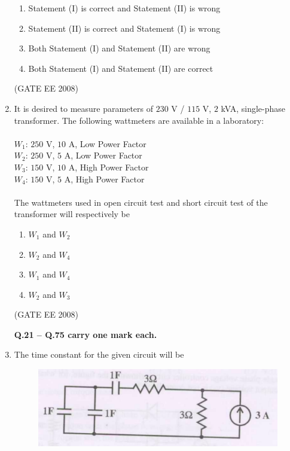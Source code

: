 \documentclass[journal,12pt,onecolumn]{IEEEtran}
\theoremstyle{remark}
\begin{document}
\begin{enumerate}[start=1, label=Q.\arabic*]
\begin{enumerate}[label=(\Alph*)]
    \item Statement (I) is correct and Statement (II) is wrong
    \item Statement (II) is correct and Statement (I) is wrong
    \item Both Statement (I) and Statement (II) are wrong
    \item Both Statement (I) and Statement (II) are correct
\end{enumerate}
\hfill (GATE EE 2008)



\item It is desired to measure parameters of $230$ V / $115$ V, $2$ kVA, single-phase transformer. The following wattmeters are available in a laboratory: \\
\\
$W_1$: $250$ V, $10$ A, Low Power Factor \\
$W_2$: $250$ V, $5$ A, Low Power Factor \\
$W_3$: $150$ V, $10$ A, High Power Factor \\
$W_4$: $150$ V, $5$ A, High Power Factor \\
\\
The wattmeters used in open circuit test and short circuit test of the transformer will respectively be

\begin{enumerate}[label=(\Alph*)]
    \item $W_1$ and $W_2$
    \item $W_2$ and $W_4$
    \item $W_1$ and $W_4$
    \item $W_2$ and $W_3$
\end{enumerate}
\hfill (GATE EE 2008)


\Large\textbf{Q.21 -- Q.75 carry one mark each.} \\[10mm]

\item The time constant for the given circuit will be

\begin{figure}[H]
    \centering
    \includegraphics[width=\columnwidth]{Fig/q21.png}
\end{figure}


\end{enumerate}
\end{document}
